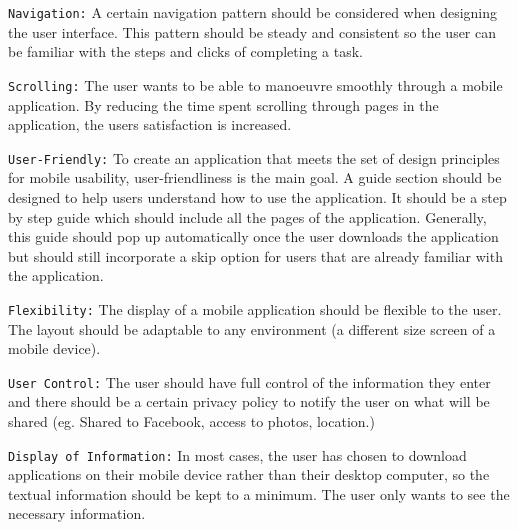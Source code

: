 \documentclass[runningheads,a4paper]{llncs}
\begin{document}
\begin{inparaenum}[]
{\texttt{Navigation:}} A certain navigation pattern should be considered when designing the user interface. This pattern should be steady and consistent so the user can be familiar with the steps and clicks of completing a task. 
\end{inparaenum}

\begin{inparaenum}[]
{\texttt{Scrolling:}} The user wants to be able to manoeuvre smoothly through a mobile application. By reducing the time spent scrolling through pages in the application, the users satisfaction is increased.
\end{inparaenum} 

\begin{inparaenum}[]
{\texttt{User-Friendly:}} To create an application that meets the set of design principles for mobile usability, user-friendliness is the main goal. A guide section should be designed to help users understand how to use the application. It should be a step by step guide which should include all the pages of the application. Generally, this guide should pop up automatically once the user downloads the application but should still incorporate a skip option for users that are already familiar with the application. 
\end{inparaenum}

\begin{inparaenum}[]
{\texttt{Flexibility:}} The display of a mobile application should be flexible to the user. The layout should be adaptable to any environment (a different size screen of a mobile device).
\cite{hashim2011mobile}
\end{inparaenum}

\begin{inparaenum}[]
{\texttt{User Control:}} The user should have full control of the information they enter and there should be a certain privacy policy to notify the user on what will be shared (eg. Shared to Facebook, access to photos, location.)
\end{inparaenum}

\begin{inparaenum}[]
{\texttt{Display of Information:}} In most cases, the user has chosen to download applications on their mobile device rather than their desktop computer, so the textual information should be kept to a minimum. The user only wants to see the necessary information.
\cite{nayebi2012state}
\end{inparaenum}
\end{document}
